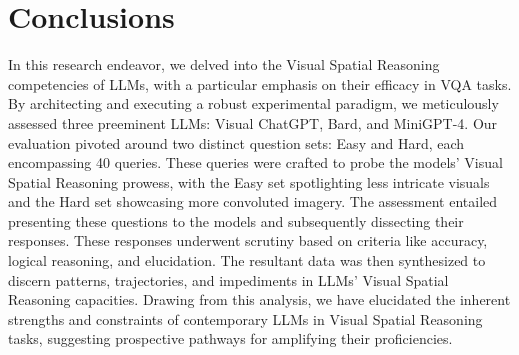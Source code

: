 \documentclass[twocolumn,11pt]{report}
\begin{document}
\chapter{Conclusions}\label{chap:conclusions}
In this research endeavor, we delved into the Visual Spatial Reasoning competencies of LLMs, with a particular emphasis on their efficacy in VQA tasks. By architecting and executing a robust experimental paradigm, we meticulously assessed three preeminent LLMs: Visual ChatGPT, Bard, and MiniGPT-4. Our evaluation pivoted around two distinct question sets: Easy and Hard, each encompassing 40 queries. These queries were crafted to probe the models' Visual Spatial Reasoning prowess, with the Easy set spotlighting less intricate visuals and the Hard set showcasing more convoluted imagery. The assessment entailed presenting these questions to the models and subsequently dissecting their responses. These responses underwent scrutiny based on criteria like accuracy, logical reasoning, and elucidation. The resultant data was then synthesized to discern patterns, trajectories, and impediments in LLMs' Visual Spatial Reasoning capacities. Drawing from this analysis, we have elucidated the inherent strengths and constraints of contemporary LLMs in Visual Spatial Reasoning tasks, suggesting prospective pathways for amplifying their proficiencies.







\appendix

\onecolumn
\end{document}
